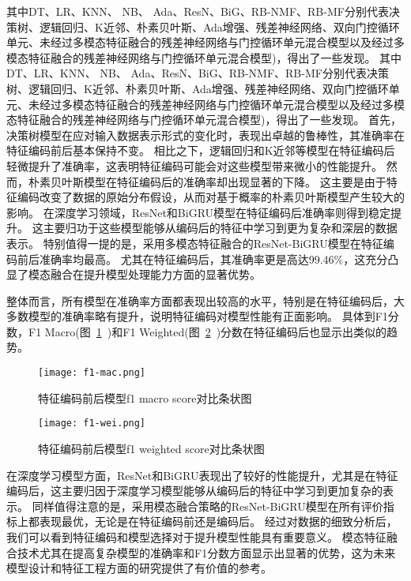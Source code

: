 其中DT、LR、KNN、 NB、 Ada、ResN、BiG、RB-NMF、RB-MF分别代表决策树、逻辑回归、K近邻、朴素贝叶斯、Ada增强、残差神经网络、双向门控循环单元、未经过多模态特征融合的残差神经网络与门控循环单元混合模型以及经过多模态特征融合的残差神经网络与门控循环单元混合模型)，得出了一些发现。
其中DT、LR、KNN、 NB、 Ada、ResN、BiG、RB-NMF、RB-MF分别代表决策树、逻辑回归、K近邻、朴素贝叶斯、Ada增强、残差神经网络、双向门控循环单元、未经过多模态特征融合的残差神经网络与门控循环单元混合模型以及经过多模态特征融合的残差神经网络与门控循环单元混合模型)，得出了一些发现。
首先，决策树模型在应对输入数据表示形式的变化时，表现出卓越的鲁棒性，其准确率在特征编码前后基本保持不变。
相比之下，逻辑回归和K近邻等模型在特征编码后轻微提升了准确率，这表明特征编码可能会对这些模型带来微小的性能提升。
然而，朴素贝叶斯模型在特征编码后的准确率却出现显著的下降。
这主要是由于特征编码改变了数据的原始分布假设，从而对基于概率的朴素贝叶斯模型产生较大的影响。
在深度学习领域，ResNet和BiGRU模型在特征编码后准确率则得到稳定提升。
这主要归功于这些模型能够从编码后的特征中学习到更为复杂和深层的数据表示。
特别值得一提的是，采用多模态特征融合的ResNet-BiGRU模型在特征编码前后准确率均最高。
尤其在特征编码后，其准确率更是高达99.46\%，这充分凸显了模态融合在提升模型处理能力方面的显著优势。\par


整体而言，所有模型在准确率方面都表现出较高的水平，特别是在特征编码后，大多数模型的准确率略有提升，说明特征编码对模型性能有正面影响。
具体到F1分数，F1 Macro(图~\ref{fig:f1_macro_score}~)和F1 Weighted(图~\ref{fig:f1_weighted_score}~)分数在特征编码后也显示出类似的趋势。
\begin{figure}[htbp]
	\centering
	\texttt{[image: f1-mac.png]}
	\caption{特征编码前后模型f1 macro score对比条状图}
	\label{fig:f1_macro_score}
\end{figure}
\begin{figure}[htbp]
	\centering
	\texttt{[image: f1-wei.png]}
	\caption{特征编码前后模型f1 weighted score对比条状图}
	\label{fig:f1_weighted_score}
\end{figure}
在深度学习模型方面，ResNet和BiGRU表现出了较好的性能提升，尤其是在特征编码后，这主要归因于深度学习模型能够从编码后的特征中学习到更加复杂的表示。
同样值得注意的是，采用模态融合策略的ResNet-BiGRU模型在所有评价指标上都表现最优，无论是在特征编码前还是编码后。
经过对数据的细致分析后，我们可以看到特征编码和模型选择对于提升模型性能具有重要意义。
模态特征融合技术尤其在提高复杂模型的准确率和F1分数方面显示出显著的优势，这为未来模型设计和特征工程方面的研究提供了有价值的参考。\par

